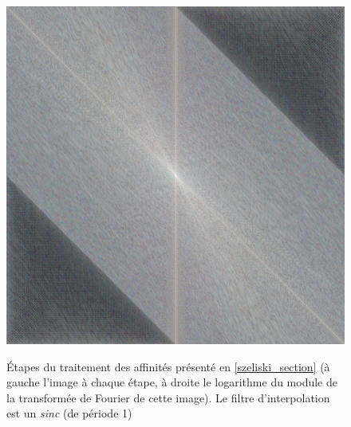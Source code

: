 \begin{figure}
{			{\includegraphics[scale=0.125]{decompoSzeliski_sinc_fourier4.png}}
		}
		\caption{Étapes du traitement des affinités présenté en \ref{szeliski_section} (à gauche l'image à chaque étape, à droite le logarithme du module de la transformée de Fourier de cette image). Le filtre d'interpolation est un \emph{sinc} (de période 1)}
		\label{experiments_decompoSzeliski_sinc}
	\end{figure}
	
